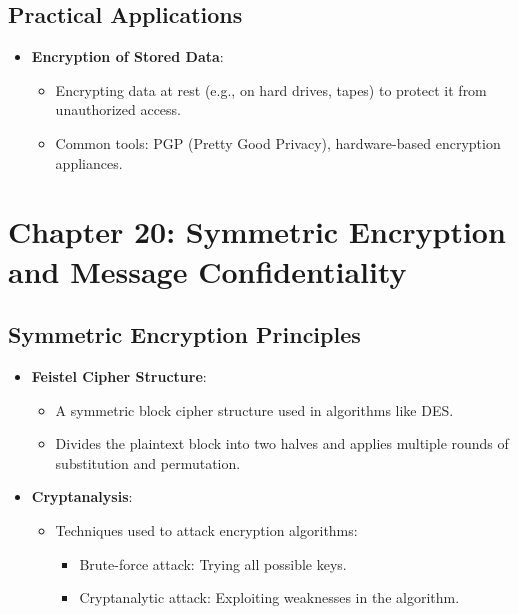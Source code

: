 \documentclass[12pt]{article}
\begin{document}
\subsection{Practical Applications}
\begin{itemize}
    \item \textbf{Encryption of Stored Data}:
    \begin{itemize}
        \item Encrypting data at rest (e.g., on hard drives, tapes) to protect it from unauthorized access.
        \item Common tools: PGP (Pretty Good Privacy), hardware-based encryption appliances.
    \end{itemize}
\end{itemize}

\section{Chapter 20: Symmetric Encryption and Message Confidentiality}

\subsection{Symmetric Encryption Principles}
\begin{itemize}
    \item \textbf{Feistel Cipher Structure}:
    \begin{itemize}
        \item A symmetric block cipher structure used in algorithms like DES.
        \item Divides the plaintext block into two halves and applies multiple rounds of substitution and permutation.
    \end{itemize}
    \item \textbf{Cryptanalysis}:
    \begin{itemize}
        \item Techniques used to attack encryption algorithms:
        \begin{itemize}
            \item Brute-force attack: Trying all possible keys.
            \item Cryptanalytic attack: Exploiting weaknesses in the algorithm.
        \end{itemize}
    \end{itemize}
\end{itemize}
\end{document}
